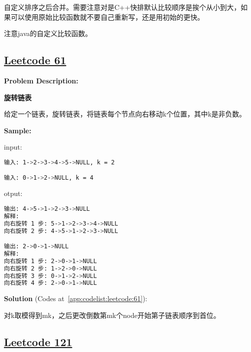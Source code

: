 自定义排序之后合并。需要注意对是C++快排默认比较顺序是挨个从小到大，如果可以使用原始比较函数就不要自己重新写，还是用初始的更快。\par

注意java的自定义比较函数。\par



\subsection{\href{https://leetcode-cn.com/}{Leetcode 61}}\label{app:problemlist:leetcode:61}

\textbf{Problem Description:}\par

\textbf{旋转链表}\par

给定一个链表，旋转链表，将链表每个节点向右移动k个位置，其中k是非负数。\par


\textbf{Sample:}\par

input:\par

\begin{lstlisting}[language=bash]
输入: 1->2->3->4->5->NULL, k = 2

输入: 0->1->2->NULL, k = 4
\end{lstlisting}

otput:\par

\begin{lstlisting}[language=bash]
输出: 4->5->1->2->3->NULL
解释:
向右旋转 1 步: 5->1->2->3->4->NULL
向右旋转 2 步: 4->5->1->2->3->NULL

输出: 2->0->1->NULL
解释:
向右旋转 1 步: 2->0->1->NULL
向右旋转 2 步: 1->2->0->NULL
向右旋转 3 步: 0->1->2->NULL
向右旋转 4 步: 2->0->1->NULL
\end{lstlisting}

\textbf{Solution }(Codes at~\ref{app:codelist:leetcode:61}):\par

对k取模得到mk，之后更改倒数第mk个node开始第子链表顺序到首位。\par



\subsection{\href{https://leetcode-cn.com/}{Leetcode 121}}\label{app:problemlist:leetcode:121}

